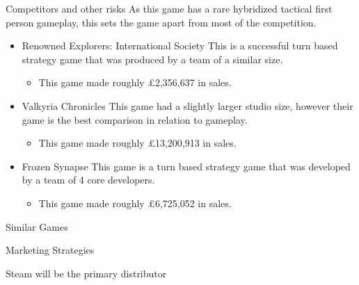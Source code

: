 \documentclass{beamer}
\begin{document}
\begin{frame}{Competitors and other risks}
	As this game has a rare hybridized tactical first person gameplay, this sets the game apart from most of the competition. 
	\begin{itemize}
		\item Renowned Explorers: International Society
		This is a successful turn based strategy game that was produced by a team of a similar size. \pause
		\begin{itemize}
			\item This game made roughly \pounds 2,356,637 in sales. \pause
		\end{itemize}
		
		\item Valkyria Chronicles
		This game had a slightly larger studio size, however their game is the best comparison in relation to gameplay. \pause
		\begin{itemize}
			\item This game made roughly \pounds 13,200,913 in sales. \pause
		\end{itemize}
		
		
		\item Frozen Synapse
		This game is a turn based strategy game that was developed by a team of 4 core developers. \pause
		\begin{itemize}
			\item This game made roughly \pounds 6,725,052 in sales. \pause
		\end{itemize}
	\end{itemize}
\end{frame}

\begin{frame}{Similar Games}
	\par
\end{frame}


\begin{frame}{Marketing Strategies}		

	Steam will be the primary distributor
\end{frame}
\end{document}

